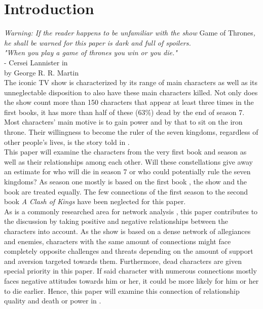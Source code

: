 \section{Introduction} \label{sec:intro}
\textit{Warning: If the reader happens to be unfamiliar with the show} Game of Thrones\textit{, he shall be warned for this paper is dark and full of spoilers.}\\

\noindent
\textit{"When you play a game of thrones you win or you die."}\\
- Cersei Lannister in \got\\
by George R. R. Martin \citep{martin1996a}\\

The iconic TV show \got{}
is characterized by its range of main characters as well as its unneglectable disposition to also have these main characters killed. Not only does the show count more than 150 characters that appear at least three times in the first books, it has more than half of these (63\%) dead by the end of season 7. Most characters' main motive is to gain power and by that to sit on the iron throne. Their willingness to become the ruler of the seven kingdoms, regardless of other people's lives, is the story told in \got.\\
This paper will examine the characters from the very first book and season as well as their relationships among each other. Will these constellations give away an estimate for who will die in season 7 or who could potentially rule the seven kingdoms? As season one mostly is based on the first book \got, the show and the book are treated equally. The few connections of the first season to the second book \textit{A Clash of Kings} \citep{martin1998a} have been neglected for this paper.\\
As \got{} is a commonly researched area for network analysis \citep{beniwal_network_2018, glander_another_2018, networkofthrones_networks_2017}, this paper contributes to the discussion by taking positive and negative relationships between the characters into account. As the show is based on a dense network of allegiances and enemies, characters with the same amount of connections might face completely opposite challenges and threats depending on the amount of support and aversion targeted towards them. Furthermore, dead characters are given special priority in this paper. If said character with numerous connections mostly faces negative attitudes towards him or her, it could be more likely for him or her to die earlier. Hence, this paper will examine this connection of relationship quality and death or power in \got.